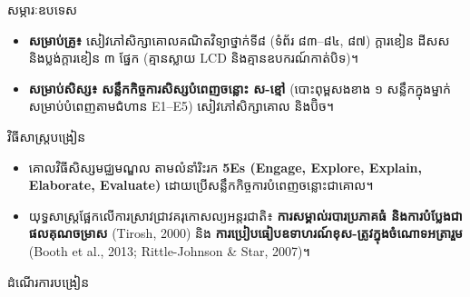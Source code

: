 \documentclass[a4paper,10pt]{article}
\newcommand{\en}[1]{{\TimesEn #1}}
\newcommand{\enbf}[1]{{\TimesEn\bfseries #1}}
\newcommand{\wcirc}{{\CourierCirc\fontsize{9.5pt}{11pt}\selectfont o}}
\begin{document}
\vspace{4pt}

{\muol \enbf{II.} សម្ភារៈឧបទេស}\par
\vspace{2pt}
\begin{itemize}[leftmargin=1.35cm, label=\wcirc, itemsep=1pt, topsep=2pt, parsep=0pt]
  \item \textbf{សម្រាប់គ្រូ៖} សៀវភៅសិក្សាគោលគណិតវិទ្យាថ្នាក់ទី៨ (ទំព័រ ៨៣–៨៤, ៨៧) ក្ដារខៀន ដីសស និងប្លង់ក្ដារខៀន ៣ ផ្នែក (គ្មានស្លាយ \en{LCD} និងគ្មានឧបករណ៍កាត់បិទ)។
  \item \textbf{សម្រាប់សិស្ស៖} \textbf{សន្លឹកកិច្ចការសិស្សបំពេញចន្លោះ ស-ខ្មៅ} (បោះពុម្ពសងខាង ១ សន្លឹកក្នុងម្នាក់ សម្រាប់បំពេញតាមជំហាន \en{E1--E5}) សៀវភៅសិក្សាគោល និងប៊ិច។
\end{itemize}

\vspace{4pt}

{\muol \enbf{III.} វិធីសាស្រ្តបង្រៀន}\par
\vspace{2pt}
\begin{itemize}[leftmargin=1.35cm, label=\wcirc, itemsep=1pt, topsep=2pt, parsep=0pt]
  \item គោលវិធីសិស្សមជ្ឈមណ្ឌល តាមលំនាំរិះរក \textbf{\en{5Es} (\en{Engage, Explore, Explain, Elaborate, Evaluate})} ដោយប្រើសន្លឹកកិច្ចការបំពេញចន្លោះជាគោល។
  \item យុទ្ធសាស្ត្រផ្អែកលើការស្រាវជ្រាវគរុកោសល្យអន្តរជាតិ៖ \textbf{ការសម្គាល់របារប្រភាគធំ និងការបំប្លែងជាផលគុណចម្រាស} (\en{Tirosh, 2000}) និង \textbf{ការប្រៀបធៀបឧទាហរណ៍ខុស-ត្រូវក្នុងចំណោទអត្រារួម} (\en{Booth et al., 2013; Rittle-Johnson \& Star, 2007})។
\end{itemize}

\vspace{4pt}

{\muol \enbf{IV.} ដំណើរការបង្រៀន}\par
\vspace{2pt}
\end{document}
